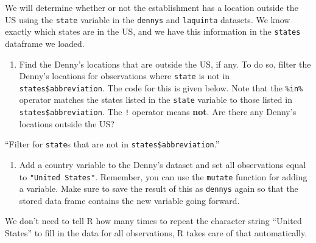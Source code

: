\documentclass[
]{article}
\newenvironment{Shaded}{\begin{snugshade}}{\end{snugshade}}
\newcommand{\FunctionTok}[1]{\textcolor[rgb]{0.13,0.29,0.53}{\textbf{#1}}}
\newcommand{\NormalTok}[1]{#1}
\newcommand{\SpecialCharTok}[1]{\textcolor[rgb]{0.81,0.36,0.00}{\textbf{#1}}}
\providecommand{\tightlist}{%
  \setlength{\itemsep}{0pt}\setlength{\parskip}{0pt}}
\begin{document}
We will determine whether or not the establishment has a location
outside the US using the \texttt{state} variable in the \texttt{dennys}
and \texttt{laquinta} datasets. We know exactly which states are in the
US, and we have this information in the \texttt{states} dataframe we
loaded.

\begin{enumerate}
\def\labelenumi{\arabic{enumi}.}
\setcounter{enumi}{4}
\tightlist
\item
  Find the Denny's locations that are outside the US, if any. To do so,
  filter the Denny's locations for observations where \texttt{state} is
  not in \texttt{states\$abbreviation}. The code for this is given
  below. Note that the \texttt{\%in\%} operator matches the states
  listed in the \texttt{state} variable to those listed in
  \texttt{states\$abbreviation}. The \texttt{!} operator means
  \textbf{not}. Are there any Denny's locations outside the US?
\end{enumerate}

\begin{marginfigure}
``Filter for \texttt{state}s that are not in
\texttt{states\$abbreviation}.''
\end{marginfigure}

\begin{Shaded}
\end{Shaded}

\begin{enumerate}
\def\labelenumi{\arabic{enumi}.}
\setcounter{enumi}{5}
\tightlist
\item
  Add a country variable to the Denny's dataset and set all observations
  equal to \texttt{"United\ States"}. Remember, you can use the
  \texttt{mutate} function for adding a variable. Make sure to save the
  result of this as \texttt{dennys} again so that the stored data frame
  contains the new variable going forward.
\end{enumerate}

\begin{marginfigure}
We don't need to tell R how many times to repeat the character string
``United States'' to fill in the data for all observations, R takes care
of that automatically.
\end{marginfigure}
\end{document}
